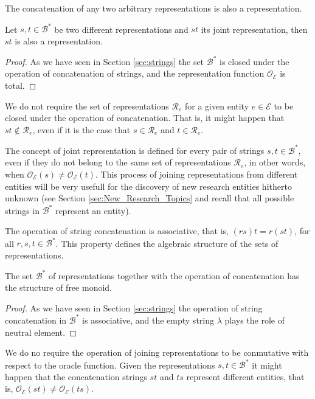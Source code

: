 The concatenation of any two arbitrary representations is also a representation.

\begin{proposition}
Let $s, t \in \mathcal{B}^\ast$ be two different representations and $st$ its joint representation, then $st$ is also a representation.
\end{proposition}
\begin{proof}
As we have seen in Section \ref{sec:strings} the set $\mathcal{B}^\ast$ is closed under the operation of concatenation of strings, and the representation function $\mathcal{O}_\mathcal{E}$ is total.
\end{proof}

We do not require the set of representations $\mathcal{R}_e$ for a given entity $e \in \mathcal{E}$ to be closed under the operation of concatenation. That is, it might happen that $st \notin \mathcal{R}_e$, even if it is the case that $s \in \mathcal{R}_e$ and $t \in \mathcal{R}_e$.

The concept of joint representation is defined for every pair of strings $s, t \in \mathcal{B}^\ast$, even if they do not belong to the same set of representations $\mathcal{R}_e$, in other words, when $\mathcal{O}_\mathcal{E} \left( s \right) \neq \mathcal{O}_\mathcal{E} \left( t \right)$. This process of joining representations from different entities will be very usefull for the discovery of new research entities hitherto unknown (see Section \ref{sec:New_Research_Topics} and recall that all possible strings in $\mathcal{B}^\ast$ represent an entity).

The operation of string concatenation is associative, that is, $(rs)t = r(st)$, for all $r, s, t \in \mathcal{B}^\ast$. This property defines the algebraic structure of the sets of representations.

\begin{proposition}
The set $\mathcal{B}^\ast$ of representations together with the operation of concatenation has the structure of free monoid.
\end{proposition}
\begin{proof}
As we have seen in Section \ref{sec:strings} the operation of string concatenation in $\mathcal{B}^\ast$ is associative, and the empty string $\lambda$ plays the role of neutral element.
\end{proof}

We do no require the operation of joining representations to be conmutative with respect to the oracle function. Given the representations $s, t \in \mathcal{B}^\ast$ it might happen that the concatenation strings $st$ and $ts$ represent different entities, that is, $\mathcal{O}_\mathcal{E} \left( st \right) \neq \mathcal{O}_\mathcal{E} \left( ts \right)$.

